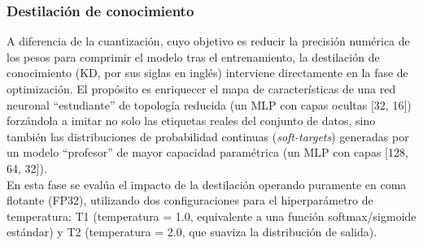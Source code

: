 \documentclass[a4paper,12pt,twoside,final]{book}
\begin{document}
\subsubsection{Destilación de conocimiento}
A diferencia de la cuantización, cuyo objetivo es reducir la precisión numérica de los pesos para comprimir el modelo
tras el entrenamiento, la destilación de conocimiento (KD, por sus siglas en inglés) interviene directamente en la fase
de optimización. El propósito es enriquecer el mapa de características de una red neuronal ``estudiante'' de topología
reducida (un MLP con capas ocultas [32, 16]) forzándola a imitar no solo las etiquetas reales del conjunto de datos, sino
también las distribuciones de probabilidad continuas (\textit{soft-targets}) generadas por un modelo ``profesor'' de mayor
capacidad paramétrica (un MLP con capas [128, 64, 32]).\\

En esta fase se evalúa el impacto de la destilación operando puramente en coma flotante (FP32), utilizando dos
configuraciones para el hiperparámetro de temperatura: T1 (temperatura = 1.0, equivalente a una función softmax/sigmoide
estándar) y T2 (temperatura = 2.0, que suaviza la distribución de salida).
\end{document}
